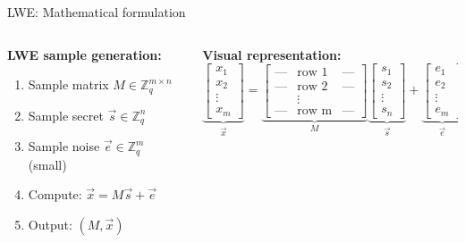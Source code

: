 \documentclass[aspectratio=169, lualatex, handout]{beamer}
\begin{document}
\begin{frame}{LWE: Mathematical formulation}
	\begin{columns}[c]
		\begin{column}{0.5\textwidth}
			\textbf{LWE sample generation:}
			\begin{enumerate}
				\item Sample matrix $M \in \mathbb{Z}_q^{m \times n}$
				\item Sample secret $\vec{s} \in \mathbb{Z}_q^n$
				\item Sample noise $\vec{e} \in \mathbb{Z}_q^m$ (small)
				\item Compute: $\vec{x} = M\vec{s} + \vec{e}$
				\item Output: $(M, \vec{x})$
			\end{enumerate}
		\end{column}
		\begin{column}{0.5\textwidth}
			\textbf{Visual representation:}
			\[
				\underbrace{\begin{bmatrix}
						x_1    \\
						x_2    \\
						\vdots \\
						x_m
					\end{bmatrix}}_{\vec{x}}
				=
				\underbrace{\begin{bmatrix}
						\text{---} & \text{row 1} & \text{---} \\
						\text{---} & \text{row 2} & \text{---} \\
						           & \vdots       &            \\
						\text{---} & \text{row m} & \text{---}
					\end{bmatrix}}_{M}
				\underbrace{\begin{bmatrix}
						s_1    \\
						s_2    \\
						\vdots \\
						s_n
					\end{bmatrix}}_{\vec{s}}
				+
				\underbrace{\begin{bmatrix}
						e_1    \\
						e_2    \\
						\vdots \\
						e_m
					\end{bmatrix}}_{\vec{e}}
			\]
		\end{column}
	\end{columns}
\end{frame}
\end{document}
